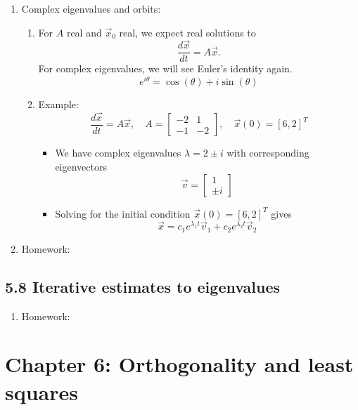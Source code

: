 \documentclass{article}
\begin{document}
\begin{enumerate}
\item Complex eigenvalues and orbits:
\begin{enumerate}
\item For $A$ real and $\vec{x}_0$ real, we expect real solutions to 
\[
\frac{d \vec{x}}{dt} = A \vec{x}.
\]
For complex eigenvalues, we will see Euler's identity again.
\[
e^{i \theta} = \cos(\theta) + i \sin(\theta)
\]
\item Example: 
\[
\frac{d \vec{x}}{dt} = A \vec{x}, \quad A = \left[
\begin{array}{cc}
-2 & 1 \\
-1 & -2
\end{array}
\right], \quad \vec{x}(0) = [6, 2]^T
\]
\begin{itemize}
\item We have complex eigenvalues $\lambda =2 \pm i$ with corresponding eigenvectors
\[
\vec{v} = \left[ 
\begin{array}{c}
1 \\ \pm i
\end{array} \right]
\]
\item Solving for the initial condition $\vec{x}(0) = [6,2]^T$ gives
\[
\vec{x} = c_1 e^{\lambda_1 t} \vec{v}_1 + c_2 e^{\lambda_2 t} \vec{v}_2
\]
\end{itemize}
\end{enumerate}

\item Homework: 

\end{enumerate}

\subsection{5.8 Iterative estimates to eigenvalues}

\begin{enumerate}

\item Homework: 

\end{enumerate}

\section{Chapter 6: Orthogonality and least squares} 
\end{document}
